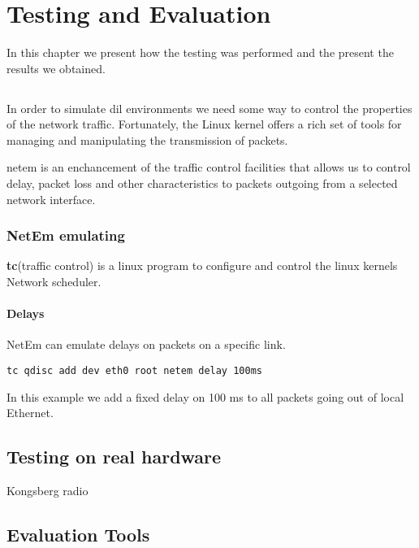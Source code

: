 \chapter{Testing and Evaluation}

In this chapter we present how the testing was performed and the present the
results we obtained.

\section{}

In order to simulate \gls{dil} environments we need some way to control the
properties of the network traffic. Fortunately, the Linux kernel offers a rich
set of tools for managing and manipulating the transmission of packets.


\gls{netem} is an enchancement of the traffic control facilities that allows us
to control delay, packet loss and other characteristics to packets outgoing from
a selected network interface.

\subsection{NetEm emulating}

\textbf{tc}(traffic control) is a linux program to configure and control the
linux kernels Network scheduler. 

\subsubsection{Delays}

NetEm can emulate delays on packets on a specific link.

\begin{lstlisting}[frame=single, caption="Emulating delay"]
  tc qdisc add dev eth0 root netem delay 100ms
\end{lstlisting}

In this example we add a fixed delay on 100 ms to all packets going out of local
Ethernet.


\section{Testing on real hardware}
Kongsberg radio


\section{Evaluation Tools}
